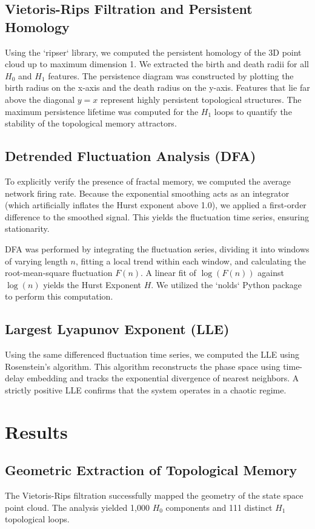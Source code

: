 \documentclass[11pt,a4paper]{article}
\begin{document}
\subsection{Vietoris-Rips Filtration and Persistent Homology}
Using the `ripser` library, we computed the persistent homology of the 3D point cloud up to maximum dimension 1. We extracted the birth and death radii for all $H_0$ and $H_1$ features. The persistence diagram was constructed by plotting the birth radius on the x-axis and the death radius on the y-axis. Features that lie far above the diagonal $y=x$ represent highly persistent topological structures. The maximum persistence lifetime was computed for the $H_1$ loops to quantify the stability of the topological memory attractors.

\subsection{Detrended Fluctuation Analysis (DFA)}
To explicitly verify the presence of fractal memory, we computed the average network firing rate. Because the exponential smoothing acts as an integrator (which artificially inflates the Hurst exponent above 1.0), we applied a first-order difference to the smoothed signal. This yields the fluctuation time series, ensuring stationarity.

DFA was performed by integrating the fluctuation series, dividing it into windows of varying length $n$, fitting a local trend within each window, and calculating the root-mean-square fluctuation $F(n)$. A linear fit of $\log(F(n))$ against $\log(n)$ yields the Hurst Exponent $H$. We utilized the `nolds` Python package to perform this computation.

\subsection{Largest Lyapunov Exponent (LLE)}
Using the same differenced fluctuation time series, we computed the LLE using Rosenstein's algorithm. This algorithm reconstructs the phase space using time-delay embedding and tracks the exponential divergence of nearest neighbors. A strictly positive LLE confirms that the system operates in a chaotic regime.

\section{Results}

\subsection{Geometric Extraction of Topological Memory}
The Vietoris-Rips filtration successfully mapped the geometry of the state space point cloud. The analysis yielded 1,000 $H_0$ components and 111 distinct $H_1$ topological loops. 
\end{document}
